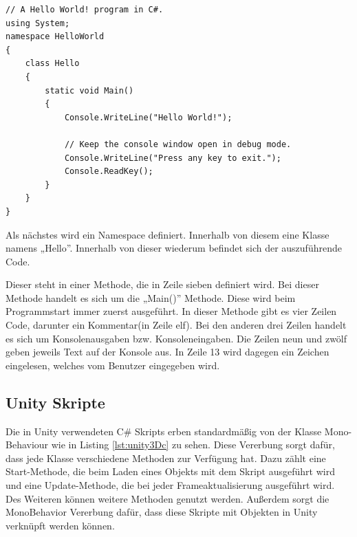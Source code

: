 	\begin{scriptsize}
	\lstset{
		float,
		caption=Hello World in C\#, 
		language=[Sharp]C, 
		frame=single,  
		showstringspaces=false, 
		showspaces=false, 
		numbers=left, 
		captionpos=b, 
		belowcaptionskip=4pt,
		basicstyle=\ttfamily
	} 
	\begin{lstlisting}[label=lst:c_helloworld]
// A Hello World! program in C#.
using System;
namespace HelloWorld
{
    class Hello 
    {
        static void Main() 
        {
            Console.WriteLine("Hello World!");

            // Keep the console window open in debug mode.
            Console.WriteLine("Press any key to exit.");
            Console.ReadKey();
        }
    }
}
	\end{lstlisting}
	\end{scriptsize}

	Als nächstes wird ein Namespace definiert. Innerhalb von diesem eine Klasse namens „Hello”. Innerhalb von dieser wiederum befindet sich der auszuführende Code.

	Dieser steht in einer Methode, die in Zeile sieben definiert wird. Bei dieser Methode handelt es sich um die „Main()” Methode. Diese wird beim Programmstart immer zuerst ausgeführt. In dieser Methode gibt es vier Zeilen Code, darunter ein Kommentar(in Zeile elf). Bei den anderen drei Zeilen handelt es sich um Konsolenausgaben bzw. Konsoleneingaben. Die Zeilen neun und zwölf geben jeweils Text auf der Konsole aus. In Zeile 13 wird dagegen ein Zeichen eingelesen, welches vom Benutzer eingegeben wird.

\subsection{Unity Skripte}

	Die in Unity verwendeten C\# Skripts erben standardmäßig von der Klasse Mono-Behaviour wie in Listing \ref{lst:unity3Dc} zu sehen. Diese Vererbung sorgt dafür, dass jede Klasse verschiedene Methoden zur Verfügung hat. Dazu zählt eine Start-Methode, die beim Laden eines Objekts mit dem Skript ausgeführt wird und eine Update-Methode, die bei jeder Frameaktualisierung ausgeführt wird. Des Weiteren können weitere Methoden genutzt werden. Außerdem sorgt die MonoBehavior Vererbung dafür, dass diese Skripte mit Objekten in Unity verknüpft werden können.

